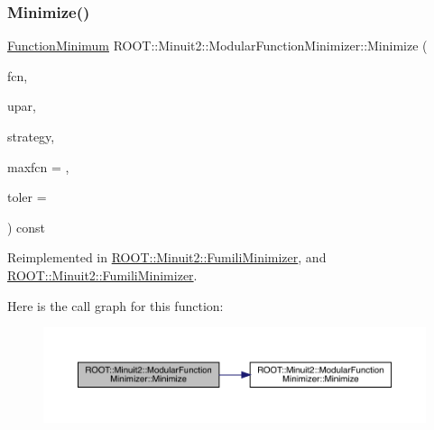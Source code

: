 \subsubsection{\texorpdfstring{Minimize()}{Minimize()}\hspace{0.1cm}{\footnotesize\ttfamily [12/22]}}
{\footnotesize\ttfamily \mbox{\hyperlink{classROOT_1_1Minuit2_1_1FunctionMinimum}{Function\+Minimum}} R\+O\+O\+T\+::\+Minuit2\+::\+Modular\+Function\+Minimizer\+::\+Minimize (\begin{DoxyParamCaption}\item[{const \mbox{\hyperlink{classROOT_1_1Minuit2_1_1FCNGradientBase}{F\+C\+N\+Gradient\+Base}} \&}]{fcn,  }\item[{const \mbox{\hyperlink{classROOT_1_1Minuit2_1_1MnUserParameters}{Mn\+User\+Parameters}} \&}]{upar,  }\item[{const \mbox{\hyperlink{classROOT_1_1Minuit2_1_1MnStrategy}{Mn\+Strategy}} \&}]{strategy,  }\item[{unsigned int}]{maxfcn = {},  }\item[{double}]{toler = {} }\end{DoxyParamCaption}) const\hspace{0.3cm}{\ttfamily [virtual]}}



Reimplemented in \mbox{\hyperlink{classROOT_1_1Minuit2_1_1FumiliMinimizer_a2b14890a2b40ae8db356b71be505ce66}{R\+O\+O\+T\+::\+Minuit2\+::\+Fumili\+Minimizer}}, and \mbox{\hyperlink{classROOT_1_1Minuit2_1_1FumiliMinimizer_a2b14890a2b40ae8db356b71be505ce66}{R\+O\+O\+T\+::\+Minuit2\+::\+Fumili\+Minimizer}}.

Here is the call graph for this function\+:\nopagebreak
\begin{figure}[H]
\begin{center}
\leavevmode
\includegraphics[width=350pt]{d3/dc8/classROOT_1_1Minuit2_1_1ModularFunctionMinimizer_a0340c3524916d898de2a4ac4364452ad_cgraph}
\end{center}
\end{figure}
\mbox{\label{classROOT_1_1Minuit2_1_1ModularFunctionMinimizer_acb99ccb1a23b88947ee5996c03c584ff}} 
